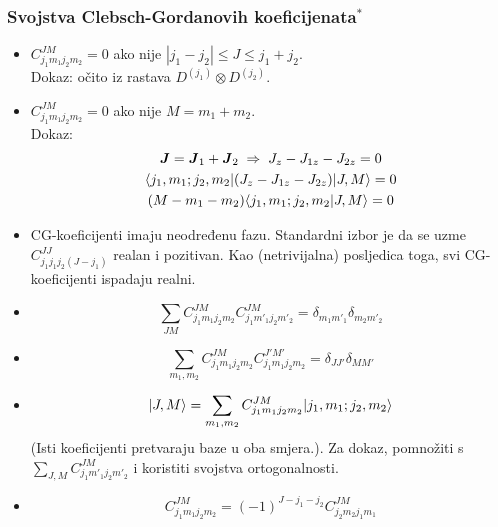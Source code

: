 \subsubsection{Svojstva Clebsch-Gordanovih koeficijenata$^*$}
\begin{itemize}
\item $C^{JM}_{j_1m_1j_2m_2}=0$ ako nije $|j_1-j_2|\le J\le j_1 + j_2$. \\
Dokaz: očito iz rastava $D^{(j_1)}\otimes D^{(j_2)}$.

\item $C^{JM}_{j_1m_1j_2m_2}=0$ ako nije $M=m_1+m_2$.\\
Dokaz: 
\begin{gather}
\vec{J}=\vec{J}_{1}+\vec{J}_{2} \imp J_z-J_{1z}-J_{2z}=0 \\
\bra{j_1, m_1; j_2, m_2}(J_z-J_{1z}-J_{2z})\ket{J, M} = 0 \\
(M-m_1-m_2)\bra{j_1, m_1; j_2, m_2} J, M\rangle = 0
\end{gather}

\item CG-koeficijenti imaju neodređenu fazu. Standardni izbor je
da se uzme $C^{JJ}_{j_1 j_1 j_2 (J-j_1)}$ realan i pozitivan.
Kao (netrivijalna) posljedica toga, svi CG-koeficijenti ispadaju realni.

\item
\begin{displaymath}
 \sum_{JM} C^{JM}_{j_1m_1j_2m_2} C^{JM}_{j_1m'_1j_2m'_2} =
\delta_{m_1 m'_1} \delta_{m_2 m'_2}
\end{displaymath}

\item
\begin{displaymath}
  \sum_{m_1, m_2} C^{JM}_{j_1m_1j_2m_2}C^{J'M'}_{j_1m_1j_2m_2} =
 \delta_{JJ'}\delta_{MM'}
\end{displaymath}

\item
\begin{displaymath}
 | J, M \rangle = \sum_{m_1, m_2} C^{JM}_{j_1m_1j_2m_2}| j_1, m_1; j_2, m_2 \rangle
\end{displaymath}
(Isti koeficijenti pretvaraju baze u oba smjera.). Za dokaz, 
pomnožiti s $\sum_{J,M}C^{JM}_{j_1m'_1j_2m'_2}$ i koristiti svojstva
ortogonalnosti.

\item
\begin{displaymath}
 C^{JM}_{j_1m_1j_2m_2} = (-1)^{J-j_1 -j_2} C^{JM}_{j_2 m_2 j_1 m_1}
\end{displaymath}
\end{itemize}


